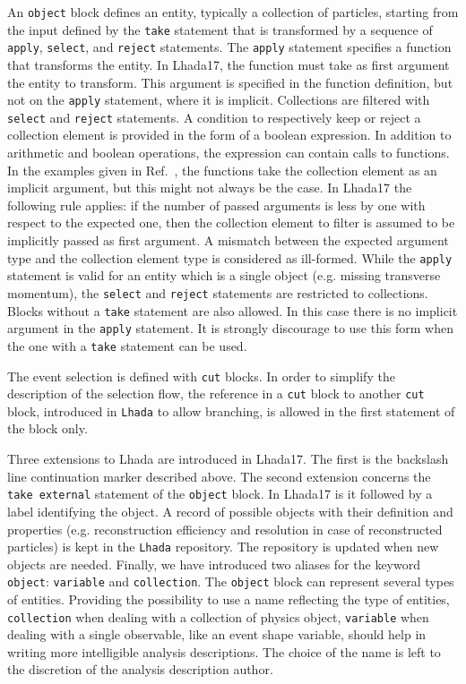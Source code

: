 \documentclass[11pt]{cernrep}
\begin{document}
An {\tt object} block defines an entity, typically a collection of particles, starting from the input defined by the {\tt take} statement that is transformed by a sequence of {\tt apply}, {\tt select}, and {\tt reject}  statements. The {\tt apply} statement specifies a function that transforms the entity. In {\sc Lhada17}, the function must take as first argument the entity to transform. This argument is specified in the function definition, but not on the {\tt apply} statement, where it is implicit. Collections are filtered with {\tt select} and {\tt reject} statements. A condition to respectively keep or reject a collection element is provided in the form of a boolean expression. In addition to arithmetic and boolean operations, the expression can contain calls to functions. In the examples given in Ref.~\cite{Brooijmans:2016vro}, the functions take the collection element as an implicit argument, but this might not always be the case. In {\sc Lhada17} the following rule applies: if the number of passed arguments is less by one with respect to the expected one, then the collection element to filter is assumed to be implicitly passed as first argument. A mismatch between the expected argument type and the collection element type is considered as ill-formed. While the {\tt apply} statement is valid for an entity which is a single object (e.g. missing transverse momentum), the {\tt select} and {\tt reject} statements are restricted to collections. Blocks without a {\tt take} statement are also allowed. In this case there is no implicit argument in the {\tt apply} statement. It is strongly discourage to use this form when the one with a {\tt take} statement can be used.

The event selection is defined with {\tt cut} blocks. In order to simplify the description of the selection flow, the reference in a {\tt cut} block to another {\tt cut} block, introduced in {\tt Lhada} to allow branching, is allowed in the first statement of the block only.

Three extensions to {\sc Lhada} are introduced in {\sc Lhada17}. The first is the backslash line continuation marker described above. The second extension concerns the {\tt take external} statement of the {\tt object} block. In {\sc Lhada17} is it followed by a label identifying the object. A record of possible objects with their definition and properties (e.g. reconstruction efficiency and resolution in case of reconstructed particles) is kept in the {\tt Lhada} repository. The repository is updated when new objects are needed. Finally, we have introduced two aliases for the keyword {\tt object}: {\tt variable} and {\tt collection}. The {\tt object} block can represent several types of entities. Providing the possibility to use a name reflecting the type of entities, {\tt collection} when dealing with a collection of physics object, {\tt variable} when dealing with a single observable, like an event shape variable, should help in writing more intelligible analysis descriptions. The choice of the name is left to the discretion of the analysis description author.
\end{document}
